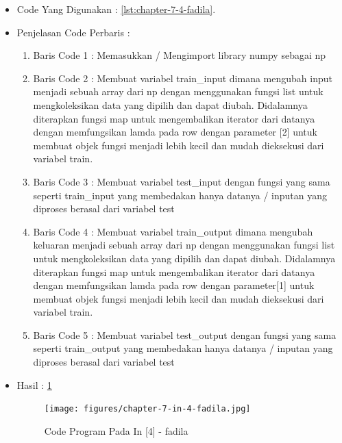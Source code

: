 \begin{enumerate}
\begin{itemize}
\item Code Yang Digunakan : \ref{lst:chapter-7-4-fadila}.

\par
\par
\item Penjelasan Code Perbaris	: 
\begin{enumerate}
\item Baris Code 1	: Memasukkan / Mengimport library numpy sebagai np
\item Baris Code 2	: Membuat variabel train\_input dimana mengubah input menjadi sebuah array dari np dengan menggunakan fungsi list untuk mengkoleksikan data yang dipilih dan dapat diubah. Didalamnya diterapkan fungsi map untuk mengembalikan iterator dari datanya dengan memfungsikan lamda pada row dengan parameter [2] untuk membuat objek fungsi menjadi lebih kecil dan mudah dieksekusi dari variabel train.
\item Baris Code 3	: Membuat variabel test\_input dengan fungsi yang sama seperti train\_input yang membedakan hanya datanya / inputan yang diproses berasal dari variabel test
\item Baris Code 4	: Membuat variabel train\_output dimana mengubah keluaran menjadi sebuah array dari np dengan menggunakan fungsi list untuk mengkoleksikan data yang dipilih dan dapat diubah. Didalamnya diterapkan fungsi map untuk mengembalikan iterator dari datanya dengan memfungsikan lamda pada row dengan parameter[1] untuk membuat objek fungsi menjadi lebih kecil dan mudah dieksekusi dari variabel train.
\item Baris Code 5	: Membuat variabel test\_output dengan fungsi yang sama seperti train\_output yang membedakan hanya datanya / inputan yang diproses berasal dari variabel test
\end{enumerate}
\par
\item Hasil : \ref{chapter-7-in-4-fadila}
\par
\par
\begin{figure}[!hbtp]
\centering
\texttt{[image: figures/chapter-7-in-4-fadila.jpg]}
\caption{Code Program Pada In [4] - fadila}
\label{chapter-7-in-4-fadila}
\end{figure}
\par
\par
\end{itemize}
\par

\end{enumerate}
